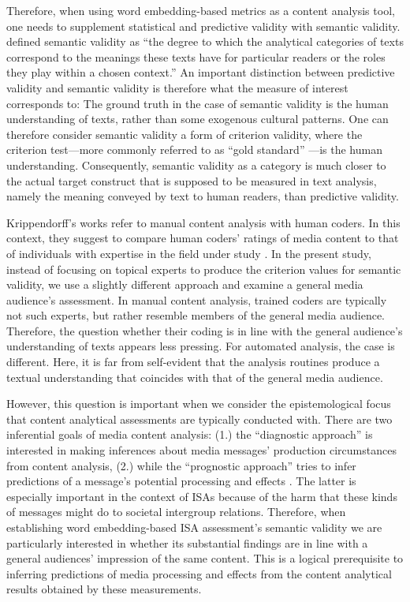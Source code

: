 Therefore, when using word embedding-based metrics as a content analysis tool, one needs to supplement statistical and predictive validity with semantic validity. \textcite[][p.323]{krippendorff2018content} defined semantic validity as ``the degree to which the analytical categories of texts correspond to the meanings these texts have for particular readers or the roles they play within a chosen context.'' An important distinction between predictive validity and semantic validity is therefore what the measure of interest corresponds to: The ground truth in the case of semantic validity is the human understanding of texts, rather than some exogenous cultural patterns. One can therefore consider semantic validity a form of criterion validity, where the criterion test---more commonly referred to as ``gold standard'' \parencite{song:2020:ivw,atteveldt:2021:VSA,lind:2017:CAC}---is the human understanding. Consequently, semantic validity as a category is much closer to the actual target construct that is supposed to be measured in text analysis, namely the meaning conveyed by text to human readers, than predictive validity. 

Krippendorff's works refer to manual content analysis with human coders. In this context, they suggest to compare human coders' ratings of media content to that of individuals with expertise in the field under study \parencite[political professionals for political texts, legal experts for legal texts etc.][]{krippendorff1980}. In the present study, instead of focusing on topical experts to produce the criterion values for semantic validity, we use a slightly different approach and examine a general media audience's assessment. In manual content analysis, trained coders are typically not such experts, but rather resemble members of the general media audience. Therefore, the question whether their coding is in line with the general audience's understanding of texts appears less pressing. For automated analysis, the case is different. Here, it is far from self-evident that the analysis routines produce a textual understanding that coincides with that of the general media audience.

However, this question is important when we consider the epistemological focus that content analytical assessments are typically conducted with. There are two inferential goals of media content analysis: (1.) the ``diagnostic approach'' is interested in making inferences about media messages' production circumstances from content analysis, (2.) while the ``prognostic approach'' tries to infer predictions of a message's potential processing and effects \parencite[][p. 13]{maurer2006}. The latter is especially important in the context of ISAs because of the harm that these kinds of messages might do to societal intergroup relations. Therefore, when establishing word embedding-based ISA assessment's semantic validity we are particularly interested in whether its substantial findings are in line with a general audiences' impression of the same content. This is a logical prerequisite to inferring predictions of media processing and effects from the content analytical results obtained by these measurements.


